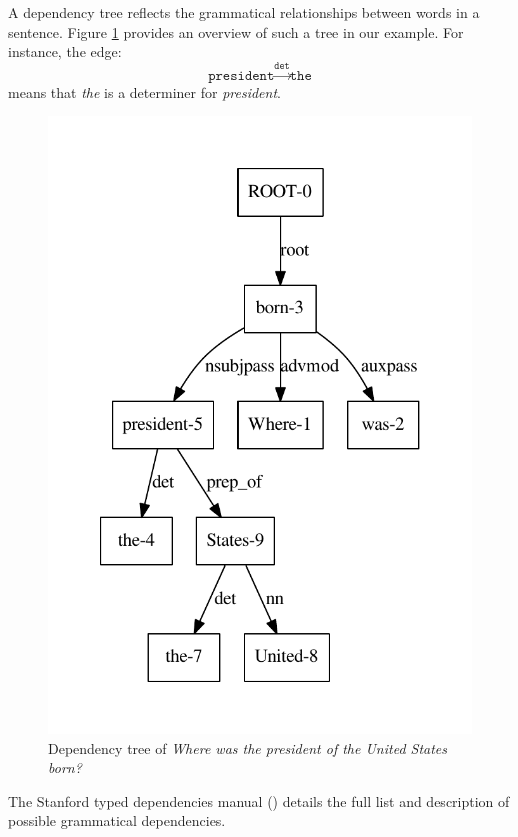 A dependency tree reflects the grammatical relationships between words in a sentence. Figure \ref{tree_one} provides an overview of such a tree in our example. For instance, the edge:
  \[\texttt{president}\xrightarrow{\texttt{det}}\texttt{the}\]
means that \emph{the} is a determiner for \emph{president}.

\begin{figure}
  \centering
    \includegraphics[scale=0.6]{../examples_NLP_grammatical/tree1bis.pdf}
  \caption{Dependency tree of \emph{Where was the president of the United States born?}}
  \label{tree_one}
\end{figure}

The Stanford typed dependencies manual (\cite{stanfordmanual}) details the full list and description of possible grammatical dependencies.

